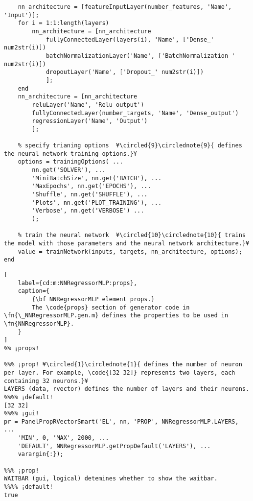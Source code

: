\documentclass{tufte-handout}
\begin{document}
\begin{lstlisting}
    nn_architecture = [featureInputLayer(number_features, 'Name', 'Input')];
    for i = 1:1:length(layers)
        nn_architecture = [nn_architecture
            fullyConnectedLayer(layers(i), 'Name', ['Dense_' num2str(i)])
            batchNormalizationLayer('Name', ['BatchNormalization_' num2str(i)])
            dropoutLayer('Name', ['Dropout_' num2str(i)])
            ];
    end
    nn_architecture = [nn_architecture
        reluLayer('Name', 'Relu_output')
        fullyConnectedLayer(number_targets, 'Name', 'Dense_output')
        regressionLayer('Name', 'Output')
        ];
    
    % specify trianing options  ¥\circled{9}\circlednote{9}{ defines the neural network training options.}¥
    options = trainingOptions( ...
        nn.get('SOLVER'), ...
        'MiniBatchSize', nn.get('BATCH'), ...
        'MaxEpochs', nn.get('EPOCHS'), ...
        'Shuffle', nn.get('SHUFFLE'), ...
        'Plots', nn.get('PLOT_TRAINING'), ...
        'Verbose', nn.get('VERBOSE') ...
        );

    % train the neural network  ¥\circled{10}\circlednote{10}{ trains the model with those parameters and the neural network architecture.}¥
    value = trainNetwork(inputs, targets, nn_architecture, options);
end

\end{lstlisting}

\begin{lstlisting}[
	label={cd:m:NNRegressorMLP:props},
	caption={
		{\bf NNRegressorMLP element props.}
		The \code{props} section of generator code in \fn{\_NNRegressorMLP.gen.m} defines the properties to be used in \fn{NNRegressorMLP}.
	}
]
%% ¡props!

%%% ¡prop! ¥\circled{1}\circlednote{1}{ defines the number of neuron per layer. For example, \code{[32 32]} represents two layers, each containing 32 neurons.}¥
LAYERS (data, rvector) defines the number of layers and their neurons.
%%%% ¡default!
[32 32]
%%%% ¡gui!
pr = PanelPropRVectorSmart('EL', nn, 'PROP', NNRegressorMLP.LAYERS, ...
    'MIN', 0, 'MAX', 2000, ...
    'DEFAULT', NNRegressorMLP.getPropDefault('LAYERS'), ...
    varargin{:});

%%% ¡prop!
WAITBAR (gui, logical) detemines whether to show the waitbar.
%%%% ¡default!
true

\end{lstlisting}

\clearpage
\end{document}
